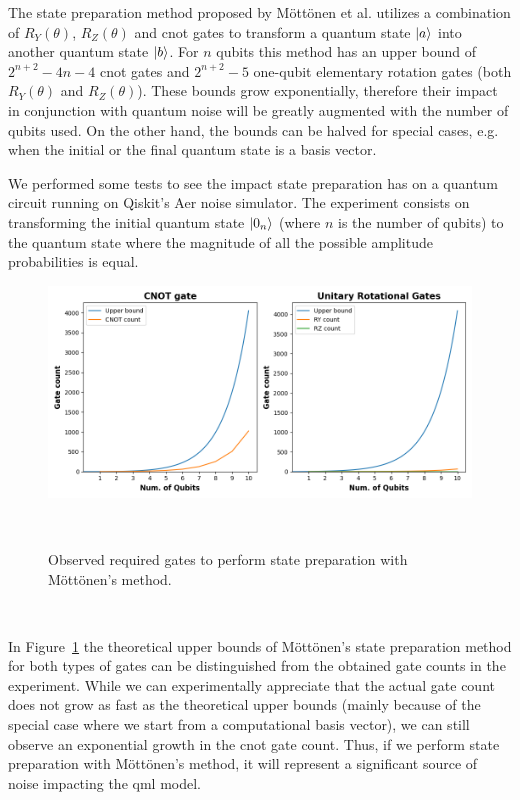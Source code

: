 The state preparation method proposed by Möttönen et al. utilizes a
combination of \(R_{Y}(\theta)\), \(R_{Z}(\theta)\) and \ac{cnot}
gates to transform a quantum state \(\ket{a}\) into another quantum state
\(\ket{b}\). For \(n\) qubits this method has an upper bound of
\(2^{n+2}-4n-4\) \ac{cnot} gates and \(2^{n+2}-5\) one-qubit elementary
rotation gates (both \(R_{Y}(\theta)\) and \(R_{Z}(\theta)\)). These
bounds grow exponentially, therefore their impact in conjunction with
quantum noise will be greatly augmented with the number of qubits used.
On the other hand, the bounds can be halved for special cases, e.g. when
the initial or the final quantum state is a basis vector. \

We performed some tests to see the impact state preparation has on
a quantum circuit running on Qiskit's Aer noise simulator. The experiment
consists on transforming the initial quantum state \(\ket{0_{n}}\)
(where \(n\) is the number of qubits) to the quantum state where the
magnitude of all the possible amplitude probabilities is equal. \

\begin{figure}[h!]
  \includegraphics[scale=0.55]{figures/state-prep-gates-count.png}
  \centering
  \caption{Observed required gates to perform state preparation with Möttönen's method.}
~\label{fig:state_prep}
\end{figure} \

In Figure~\ref{fig:state_prep} the theoretical upper bounds of
Möttönen's state preparation method for both types of gates can
be distinguished from the obtained gate counts in the experiment.
While we can experimentally appreciate that the actual gate count
does not grow as fast as the theoretical upper bounds (mainly because
of the special case where we start from a computational basis vector),
we can still observe an exponential growth in the \ac{cnot} gate count.
Thus, if we perform state preparation with Möttönen's method, it will
represent a significant source of noise impacting the \ac{qml} model. \

